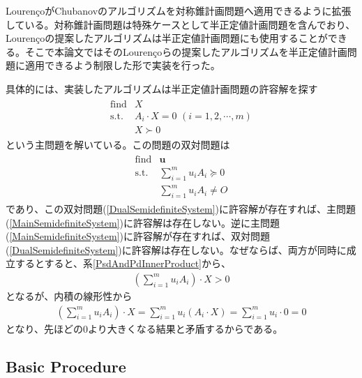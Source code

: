 Louren\c{c}oがChubanovのアルゴリズムを対称錐計画問題へ適用できるように拡張している\cite*{SymmetricCone}。対称錐計画問題は特殊ケースとして半正定値計画問題を含んでおり、Louren\c{c}oの提案したアルゴリズムは半正定値計画問題にも使用することができる。そこで本論文ではそのLouren\c{c}oらの提案したアルゴリズムを半正定値計画問題に適用できるよう制限した形で実装を行った。

具体的には、実装したアルゴリズムは半正定値計画問題の許容解を探す
\begin{align} \label{MainSemidefiniteSystem}
  \begin{array}{ll}
    \text{find} & X \\
    \text{s.t.} & A_i \cdot X = 0 \,\, (i = 1, 2, \cdots, m) \\
                & X \succ 0
  \end{array}
\end{align}
という主問題を解いている。この問題の双対問題は
\begin{align} \label{DualSemidefiniteSystem}
  \begin{array}{ll}
    \text{find} & \mathbf{u} \\
    \text{s.t.} & \displaystyle{\sum_{i = 1}^m} u_i A_i \succeq 0 \\
                & \displaystyle{\sum_{i = 1}^m} u_i A_i \not= O
  \end{array}
\end{align}
であり、この双対問題(\ref{DualSemidefiniteSystem})に許容解が存在すれば、主問題(\ref{MainSemidefiniteSystem})に許容解は存在しない。逆に主問題(\ref{MainSemidefiniteSystem})に許容解が存在すれば、双対問題(\ref{DualSemidefiniteSystem})に許容解は存在しない。なぜならば、両方が同時に成立するとすると、系\ref{PsdAndPdInnerProduct}から、
\begin{align*}
  \left(\displaystyle{\sum_{i = 1}^m} u_i A_i\right) \cdot X > 0
\end{align*}
となるが、内積の線形性から
\begin{align*}
  \left(\displaystyle{\sum_{i = 1}^m} u_i A_i\right) \cdot X = \displaystyle{\sum_{i = 1}^m} u_i \left(A_i \cdot X\right)
                                                             = \displaystyle{\sum_{i = 1}^m} u_i \cdot 0
                                                             = 0
\end{align*}
となり、先ほどの$0$より大きくなる結果と矛盾するからである。

\subsection{Basic Procedure}
